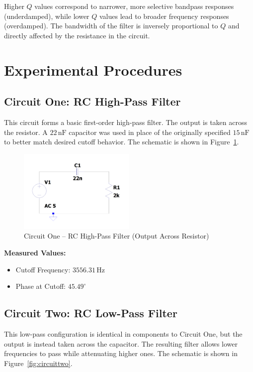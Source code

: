 \documentclass[12pt]{article}
\begin{document}
Higher $Q$ values correspond to narrower, more selective bandpass responses (underdamped), while lower $Q$ values lead to broader frequency responses (overdamped). The bandwidth of the filter is inversely proportional to $Q$ and directly affected by the resistance in the circuit.

\section{Experimental Procedures}

\subsection{Circuit One: RC High-Pass Filter}
This circuit forms a basic first-order high-pass filter. The output is taken across the resistor. A $22\,\mathrm{nF}$ capacitor was used in place of the originally specified $15\,\mathrm{nF}$ to better match desired cutoff behavior. The schematic is shown in Figure~\ref{fig:circuitone}.

\begin{figure}[H]
	\centering
	\includegraphics[width=0.5\textwidth]{e6_01}
	\caption{Circuit One – RC High-Pass Filter (Output Across Resistor)}
	\label{fig:circuitone}
\end{figure}

\noindent \textbf{Measured Values:}
\begin{itemize}
	\item Cutoff Frequency: $3556.31\,\mathrm{Hz}$
	\item Phase at Cutoff: $45.49^\circ$
\end{itemize}

\subsection{Circuit Two: RC Low-Pass Filter}
This low-pass configuration is identical in components to Circuit One, but the output is instead taken across the capacitor. The resulting filter allows lower frequencies to pass while attenuating higher ones. The schematic is shown in Figure~\ref{fig:circuittwo}.
\end{document}

